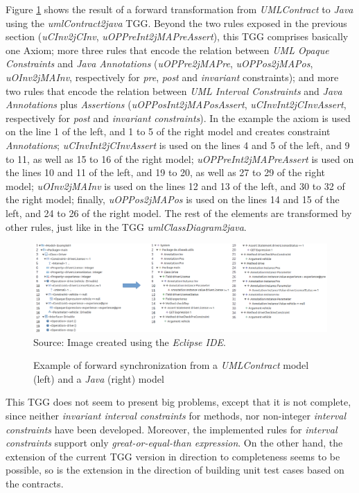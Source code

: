 \documentclass[tuberlin,cic,tc,english,noabntcite, oneside]{iiufrgs}
\begin{document}
Figure \ref{fig:umlContracts2java_Example01} shows the result of a forward transformation from \emph{UMLContract} to \emph{Java} using the \emph{umlContract2java} TGG. Beyond the two rules exposed in the previous section (\emph{uCInv2jCInv}, \emph{uOPPreInt2jMAPreAssert}), this TGG comprises basically one Axiom; more three rules that encode the relation between \emph{UML Opaque Constraints} and \emph{Java Annotations} (\emph{uOPPre2jMAPre},  \emph{uOPPos2jMAPos}, \emph{uOInv2jMAInv}, respectively for \emph{pre}, \emph{post} and \emph{invariant} constraints); and more two rules that encode the relation between \emph{UML Interval Constraints} and \emph{Java Annotations} plus \emph{Assertions} (\emph{uOPPosInt2jMAPosAssert}, \emph{uCInvInt2jCInvAssert}, respectively for \emph{post} and \emph{invariant constraints}). In the example the axiom is used on the line 1 of the left, and 1 to 5 of the right model and creates constraint \emph{Annotations}; \emph{uCInvInt2jCInvAssert} is used on the lines 4 and 5 of the left, and 9 to 11, as well as 15 to 16 of the right model; \emph{uOPPreInt2jMAPreAssert} is used on the lines 10 and 11 of the left, and 19 to 20, as well as 27 to 29 of the right model;  \emph{uOInv2jMAInv} is used on the lines 12 and 13 of the left, and 30 to 32 of the right model; finally, \emph{uOPPos2jMAPos} is used on the lines 14 and 15 of the left, and 24 to 26 of the right model. The rest of the elements are transformed by other rules, just like in the TGG \emph{umlClassDiagram2java}.

\begin{figure}[H]
	\centering
    \caption{Example of forward synchronization from a \emph{UMLContract} model (left) and a \emph{Java} (right) model}
    \includegraphics[width=\textwidth]{umlContracts2java_Example01} \\
    Source: Image created using the \emph{Eclipse IDE}.
    \label{fig:umlContracts2java_Example01}
\end{figure}

This TGG does not seem to present big problems, except that it is not complete, since neither \emph{invariant interval constraints} for methods, nor non-integer \emph{interval constraints} have been developed. Moreover, the implemented rules for \emph{interval constraints} support only \emph{great-or-equal-than expression}. On the other hand, the extension of the current TGG version in direction to completeness seems to be possible, so is the extension in the direction of building unit test cases based on the contracts.
\end{document}
